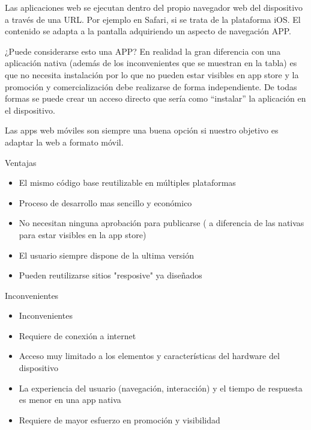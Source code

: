 Las aplicaciones web se ejecutan dentro del propio navegador web del dispositivo a través de una URL. Por ejemplo en Safari, si se trata de la plataforma iOS. El contenido se adapta a la pantalla adquiriendo un aspecto de navegación APP.

¿Puede considerarse esto una APP? En realidad la gran diferencia con una aplicación nativa (además de los inconvenientes que se muestran en la tabla) es que no necesita instalación por lo que no pueden estar visibles en app store y la promoción y comercialización debe realizarse de forma independiente. De todas formas se puede crear un acceso directo que sería como “instalar” la aplicación en el dispositivo.

Las apps web móviles son siempre una buena opción si nuestro objetivo es adaptar la web a formato móvil.

Ventajas
\setlength{\parskip}{0mm}
\begin{itemize}

	\item El mismo código base reutilizable en múltiples plataformas 
	
	\item Proceso de desarrollo mas sencillo y económico 
	
	\item No necesitan ninguna aprobación para publicarse ( a diferencia de las nativas para estar visibles en la app store)
	
	\item El usuario siempre dispone de la ultima versión 
	
	\item Pueden reutilizarse sitios "resposive" ya diseñados
	
\end{itemize}

Inconvenientes

\begin{itemize}

	\item Inconvenientes
	
	\item Requiere de conexión a internet
	
	\item Acceso muy limitado a los elementos y características del hardware del dispositivo
	
	\item La experiencia del usuario (navegación, interacción) y el tiempo de respuesta es menor en una app nativa
	
	\item Requiere de mayor esfuerzo en promoción y visibilidad

\end{itemize}

